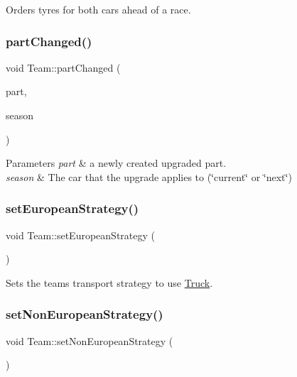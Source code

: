 Orders tyres for both cars ahead of a race. \mbox{\label{classTeam_add32843daa734d808b93e5a9793b158a}} 
\subsubsection{\texorpdfstring{part\+Changed()}{partChanged()}}
{\footnotesize\ttfamily void Team\+::part\+Changed (\begin{DoxyParamCaption}\item[{\hyperlink{classDepartmentOutput}{Department\+Output} $\ast$}]{part,  }\item[{string}]{season }\end{DoxyParamCaption})}


\begin{DoxyParams}{Parameters}
{\em part} & a newly created upgraded part. \\
\hline
{\em season} & The car that the upgrade applies to (\char`\"{}current\char`\"{} or \char`\"{}next\char`\"{}) \\
\hline
\end{DoxyParams}
\mbox{\label{classTeam_a1fad6776814f2caf74088ee644435ae1}} 
\subsubsection{\texorpdfstring{set\+European\+Strategy()}{setEuropeanStrategy()}}
{\footnotesize\ttfamily void Team\+::set\+European\+Strategy (\begin{DoxyParamCaption}{ }\end{DoxyParamCaption})}

Sets the team\textquotesingle{}s transport strategy to use \hyperlink{classTruck}{Truck}. \mbox{\label{classTeam_a0eb5e6b897c90aa5026be4a0822c9fa5}} 
\subsubsection{\texorpdfstring{set\+Non\+European\+Strategy()}{setNonEuropeanStrategy()}}
{\footnotesize\ttfamily void Team\+::set\+Non\+European\+Strategy (\begin{DoxyParamCaption}{ }\end{DoxyParamCaption})}

